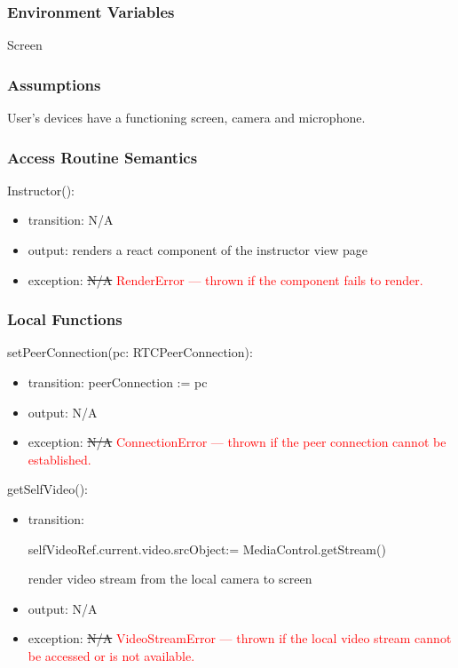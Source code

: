 \documentclass[12pt, titlepage]{article}
\newcommand{\rt}[1]{\textcolor{red}{#1}}
\begin{document}
\subsubsection{Environment Variables}

\noindent Screen

\subsubsection{Assumptions}

User's devices have a functioning screen, camera and microphone.

\subsubsection{Access Routine Semantics}

\noindent Instructor():
\begin{itemize}
\item transition: N/A
\item output: renders a react component of the instructor view page
\item exception: \sout{N/A} \rt{RenderError --- thrown if the component fails to render.}
\end{itemize}

\subsubsection{Local Functions}

\noindent setPeerConnection(pc: RTCPeerConnection):
\begin{itemize}
\item transition: peerConnection := pc
\item output: N/A
\item exception: \sout{N/A} \rt{ConnectionError --- thrown if the peer connection cannot be established.}
\end{itemize}

\noindent getSelfVideo():
\begin{itemize}
\item transition:

  selfVideoRef.current.video.srcObject:= MediaControl.getStream()

  render video stream from the local camera to screen
\item output: N/A
\item exception: \sout{N/A} \rt{VideoStreamError --- thrown if the local video stream cannot be accessed or is not available.}
\end{itemize}
\end{document}

